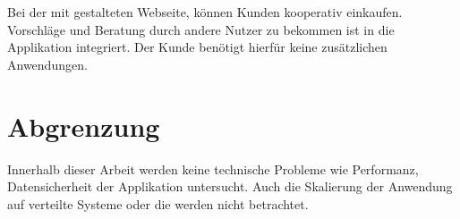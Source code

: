 Bei der mit  gestalteten Webseite, können Kunden kooperativ einkaufen. Vorschläge und Beratung durch andere Nutzer zu bekommen ist in die Applikation integriert. Der Kunde benötigt hierfür keine zusätzlichen Anwendungen.


\section{Abgrenzung}

Innerhalb dieser Arbeit werden keine technische Probleme wie Performanz, Datensicherheit der Applikation untersucht. Auch die Skalierung der Anwendung auf verteilte Systeme oder die  werden nicht betrachtet.

